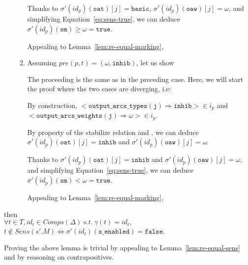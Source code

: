 \documentclass[dvipsnames,12pt]{article}
\begin{document}
\begin{niproof}
\begin{enumerate}
\begin{enumerate}
      \noindent{}Thanks to $\sigma'(id_p)(\texttt{oat})[j]=\mathtt{basic}$,
      $\sigma'(id_p)(\texttt{oaw})[j]=\omega$, and simplifying
      Equation~\eqref{eq:sens-true}, we can deduce
      $\sigma'(id_p)(\texttt{sm})\ge\omega=\mathtt{true}$.

      \noindent{}Appealing to Lemma~\ref{lem:re-equal-marking},

    \item Assuming $pre(p,t)=(\omega,\mathtt{inhib})$, let us show

      The proceeding is the same as in the preceding case. Here, we
      will start the proof where the two cases are diverging, i.e:

      \noindent{}By construction,
      ${<}\mathtt{output\_arcs\_types(j)\Rightarrow{}inhib}{>}\in{}i_p$
      and\\
      ${<}\mathtt{output\_arcs\_weights(j)\Rightarrow{}}\omega{>}\in{}i_p$.

      \noindent{}By property of the stabilize relation and \InCsCompP,
      we can deduce $\sigma'(id_p)(\texttt{oat})[j]=\mathtt{inhib}$ and
      $\sigma'(id_p)(\texttt{oaw})[j]=\omega$.

      \noindent{}Thanks to $\sigma'(id_p)(\texttt{oat})[j]=\mathtt{inhib}$
      and $\sigma'(id_p)(\texttt{oaw})[j]=\omega$, and simplifying
      Equation~\eqref{eq:sens-true}, we can deduce
      $\sigma'(id_p)(\texttt{sm})<\omega=\mathtt{true}$.

      \noindent{}Appealing to Lemma~\ref{lem:re-equal-marking},
    \end{enumerate}

  \end{enumerate}
\end{niproof}

\begin{lemma}
  \label{lem:re-equal-not-sens}
  \rehyps{} then\\
  $\forall{}t\in{}T,id_t\in{}Comps(\Delta)~s.t.~\gamma(t)=id_t,$
  $t\notin{}Sens(s'.M)\Leftrightarrow\sigma'(id_t)(\texttt{s\_enabled})=\mathtt{false}$.
\end{lemma}

\begin{niproof}
  Proving the above lemma is trivial by appealing to
  Lemma~\ref{lem:re-equal-sens} and by reasoning on
  contrapositives.
\end{niproof}
\end{document}
